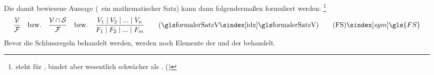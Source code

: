 Die damit bewiesene Aussage (\textzB\ ein mathematischer Satz) kann dann folgendermaßen formuliert werden:%
\footnote{%
	\symqt{$\srand$} steht für , bindet aber wesentlich schwächer als . ()
}
\[
	\frac{\Voraussetzungen}{\Folgerungen} \quad \text{\textbzw} \quad
	\frac{\Voraussetzungen \cap \Beweisschritte}{\Folgerungen} \quad \text{\textbzw} \quad
	\frac{\Voraussetzung_1 \srand \Voraussetzung_2 \srand ... \srand \Voraussetzung_n}{\Folgerung_1 \srand \Folgerung_2 \srand ... \srand \Folgerung_m}
	\qquad \text{(\glsIdx{formalerSatzV})}
	\tag{\tagFS} \sym{\gls{FS}}
	\label{def:formalerSatz}
\]
Bevor die Schlussregeln behandelt werden, werden noch Elemente der \emph{} und der \emph{} behandelt.


